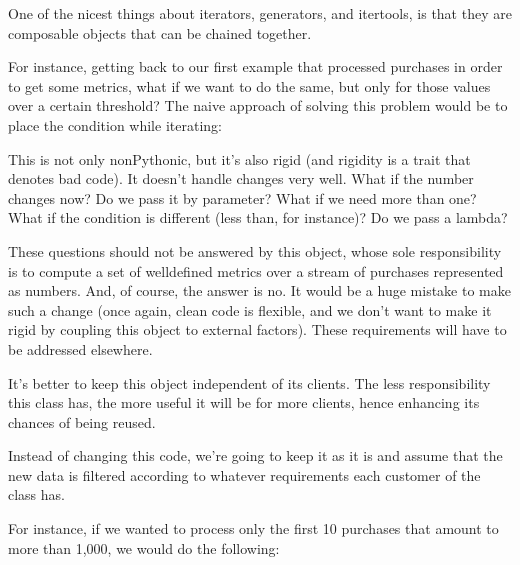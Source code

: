 \documentclass[a4paper,10pt,english]{sphinxmanual}
\begin{document}
One of the nicest things about iterators, generators, and itertools, is that they are
composable objects that can be chained together.

For instance, getting back to our first example that processed purchases in order to get
some metrics, what if we want to do the same, but only for those values over a certain
threshold? The naive approach of solving this problem would be to place the condition
while iterating:

\begin{sphinxVerbatim}[commandchars=\\\{\}]
 
       
           
\end{sphinxVerbatim}

This is not only non\sphinxhyphen{}Pythonic, but it’s also rigid (and rigidity is a trait that denotes bad
code). It doesn’t handle changes very well. What if the number changes now? Do we pass it
by parameter? What if we need more than one? What if the condition is different (less than,
for instance)? Do we pass a lambda?

These questions should not be answered by this object, whose sole responsibility is to
compute a set of well\sphinxhyphen{}defined metrics over a stream of purchases represented as numbers.
And, of course, the answer is no. It would be a huge mistake to make such a change (once
again, clean code is flexible, and we don’t want to make it rigid by coupling this object to
external factors). These requirements will have to be addressed elsewhere.

It’s better to keep this object independent of its clients. The less responsibility this class has,
the more useful it will be for more clients, hence enhancing its chances of being reused.

Instead of changing this code, we’re going to keep it as it is and assume that the new data is
filtered according to whatever requirements each customer of the class has.

For instance, if we wanted to process only the first 10 purchases that amount to more than
1,000, we would do the following:

\begin{sphinxVerbatim}[commandchars=\\\{\}]
   
        
  
\end{sphinxVerbatim}
\end{document}
